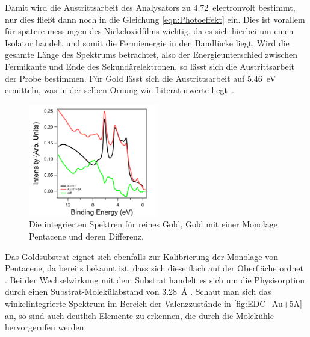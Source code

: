         Damit wird die Austrittsarbeit des Analysators zu \SI{4.72}{electronvolt} bestimmt, nur dies fließt dann noch in die Gleichung \ref{eqn:Photoeffekt} ein.
        Dies ist vorallem für spätere messungen des Nickeloxidfilms wichtig, da es sich hierbei um einen Isolator handelt und somit die Fermienergie in den Bandlücke liegt.
        Wird die gesamte Länge des Spektrums betrachtet, also der Energieunterschied zwischen Fermikante und Ende des Sekundärelektronen, so lässt sich die Austrittsarbeit der Probe bestimmen.
        Für Gold lässt sich die Austrittsarbeit auf \SI{5.46}{\electronvolt} ermitteln, was in der selben Ornung wie Literaturwerte liegt~\cite{Hüfner}.

        \begin{figure}
            \centering
            \includegraphics[width=0.5\textwidth]{./content/pictures/Au+5A/EDC_Au_5A.png}
            \caption{Die integrierten Spektren für reines Gold, Gold mit einer Monolage Pentacene und deren Differenz.}
            \label{fig:EDC_Au+5A}
        \end{figure}
        Das Goldsubstrat eignet sich ebenfalls zur Kalibrierung der Monolage von Pentacene, da bereits bekannt ist, dass sich diese flach auf der Oberfläche ordnet \cite{5A_1}.
        Bei der Wechselwirkung mit dem Substrat handelt es sich um die Physisorption durch einen Substrat-Molekülabstand von \SI{3.28}{\angstrom} \cite{5A_1}.
        Schaut man sich das winkelintegrierte Spektrum im Bereich der Valenzzustände in \autoref{fig:EDC_Au+5A} an, so sind auch deutlich Elemente zu erkennen, die durch die Molekühle hervorgerufen werden.

